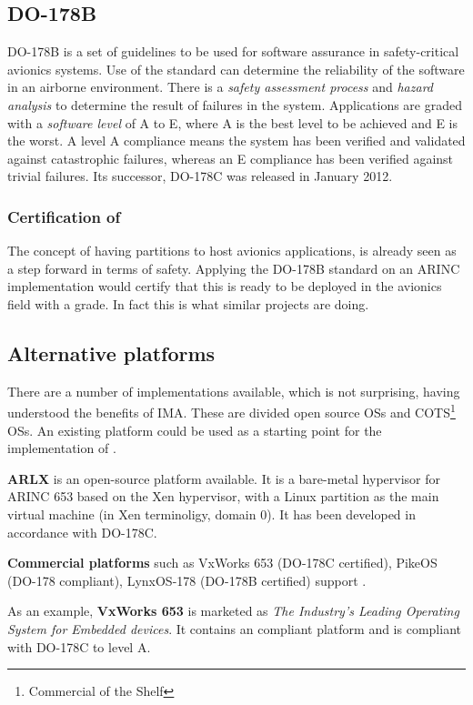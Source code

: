 \subsection{DO-178B}
DO-178B\cite{do178b_wiki} is a set of guidelines to be used for
software assurance in safety-critical avionics systems.
Use of the standard can determine the reliability of the software in an airborne environment.
There is a \textit{safety assessment process} and \textit{hazard analysis} to determine the result of failures in the system.
Applications are graded with a \textit{software level} of A to E,
where A is the best level to be achieved and E is the worst.
A level A compliance means the system has been verified and validated against catastrophic failures,
whereas an E compliance has been verified against trivial failures.
Its successor, DO-178C\cite{do178c_wiki} was released in January 2012.

\subsubsection{Certification of \arinc{}}
The concept of having partitions
to host avionics applications, is already seen as a step
forward in terms of safety.
Applying the DO-178B standard on an ARINC implementation would certify
that this is ready to be deployed in the avionics field with a grade.
In fact this is what similar projects are doing.

\subsection{Alternative \arinc{} platforms}
There are a number of \arinc{} implementations available, which is not
surprising, having understood the benefits of IMA.
These are divided open source OSs and COTS\footnote{Commercial of the Shelf} OSs.
An existing platform could be used as a starting point for
the implementation of \OSname{}.

\textbf{ARLX}\cite{arlx}
is an open-source platform available. It is a bare-metal hypervisor
for ARINC 653 based on the Xen hypervisor, with a Linux partition as the main
virtual machine (in Xen terminoligy, domain 0).
It has been developed in accordance with DO-178C.

\textbf{Commercial platforms}
such as VxWorks 653 (DO-178C certified)\cite{vxworks},
PikeOS (DO-178 compliant)\cite{pikeos},
LynxOS-178 (DO-178B certified)\cite{linxos}
support \arinc{}.

As an example, \textbf{VxWorks 653}
is marketed as \textit{The Industry's Leading Operating System for Embedded devices}\cite{vxworks}.
It contains an \arinc{} compliant platform and is compliant with DO-178C to level A.

